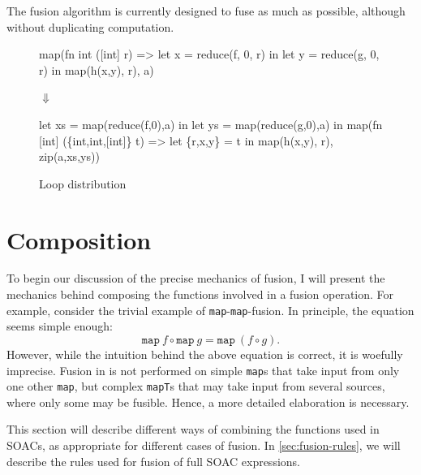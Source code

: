 The fusion algorithm is currently designed to fuse as much as
possible, although without duplicating computation.

\begin{figure}
\begin{center}
\begin{bcolorcode}
map(fn int ([int] r) =>
      let x = reduce(f, 0, r) in
      let y = reduce(g, 0, r) in
      map(h(x,y), r),
    a)
\end{bcolorcode}

$\Downarrow$

\begin{bcolorcode}
let xs = map(reduce(f,0),a) in
let ys = map(reduce(g,0),a) in
map(fn [int] (\{int,int,[int]\} t) =>
      let \{r,x,y\} = t in
      map(h(x,y), r),
    zip(a,xs,ys))
\end{bcolorcode}
\end{center}
\caption{Loop distribution}
\label{fig:loop-distribution}
\end{figure}

\section{Composition}

\newcommand\mapcompose[7]{ (#1,#2) \underset{\texttt{map}}{\overset{#3}\circ}(#4,#5) \Rightarrow (#6,#7) }
\newcommand\filtercompose[7]{ (#1,#2) \underset{\texttt{filter}}{\overset{#3}\circ}(#4,#5) \Rightarrow (#6,#7) }
\newcommand\foldcompose[7]{ (#1,#2) \underset{\texttt{fold}}{\overset{#3}\circ}(#4,#5) \Rightarrow (#6,#7) }
\newcommand\inputmapping[0]{\mathcal{I}}
\newcommand\arrparams[1]{\textrm{params}(#1)}

To begin our discussion of the precise mechanics of fusion, I will
present the mechanics behind composing the functions involved in a
fusion operation.  For example, consider the trivial example of
\texttt{map}-\texttt{map}-fusion.  In principle, the equation seems
simple enough:
\[
\texttt{map}\ f \circ \texttt{map}\ g = \texttt{map}\ (f \circ g).
\]
However, while the intuition behind the above equation is correct, it
is woefully imprecise.  Fusion in \LO{} is not performed on simple
\texttt{map}s that take input from only one other \texttt{map}, but
complex \texttt{mapT}s that may take input from several sources, where
only some may be fusible.  Hence, a more detailed elaboration is
necessary.

This section will describe different ways of combining the functions
used in SOACs, as appropriate for different cases of fusion.  In
\cref{sec:fusion-rules}, we will describe the rules used for fusion of
full SOAC expressions.

